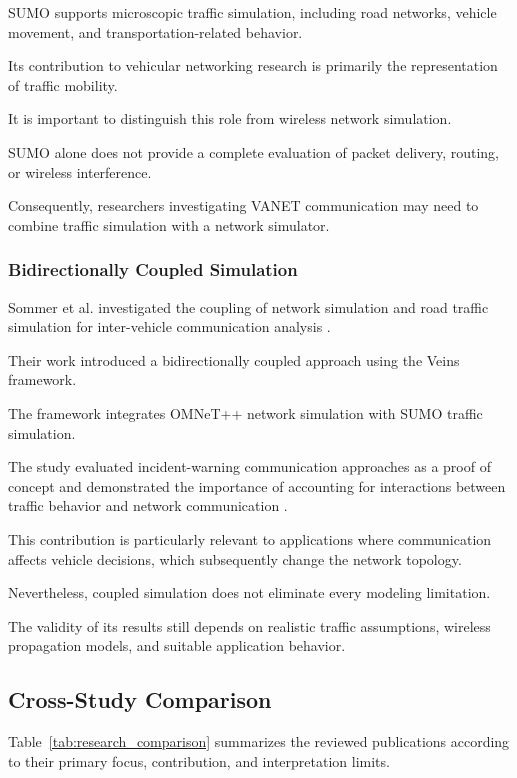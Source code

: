 SUMO supports microscopic
traffic simulation,
including road networks,
vehicle movement, and
transportation-related
behavior.

Its contribution to
vehicular networking
research is primarily
the representation of
traffic mobility.

It is important to
distinguish this role
from wireless network
simulation.

SUMO alone does not
provide a complete
evaluation of packet
delivery, routing,
or wireless interference.

Consequently, researchers
investigating VANET
communication may need
to combine traffic
simulation with a
network simulator.

\subsubsection{Bidirectionally Coupled Simulation}

Sommer et al. investigated
the coupling of network
simulation and road
traffic simulation for
inter-vehicle communication
analysis \cite{Sommer2011}.

Their work introduced
a bidirectionally coupled
approach using the
Veins framework.

The framework integrates
OMNeT++ network simulation
with SUMO traffic
simulation.

The study evaluated
incident-warning
communication approaches
as a proof of concept
and demonstrated the
importance of accounting
for interactions between
traffic behavior and
network communication
\cite{Sommer2011}.

This contribution is
particularly relevant
to applications where
communication affects
vehicle decisions,
which subsequently
change the network
topology.

Nevertheless, coupled
simulation does not
eliminate every
modeling limitation.

The validity of
its results still
depends on realistic
traffic assumptions,
wireless propagation
models, and suitable
application behavior.

\subsection{Cross-Study Comparison}

Table~\ref{tab:research_comparison}
summarizes the reviewed
publications according
to their primary focus,
contribution, and
interpretation limits.

